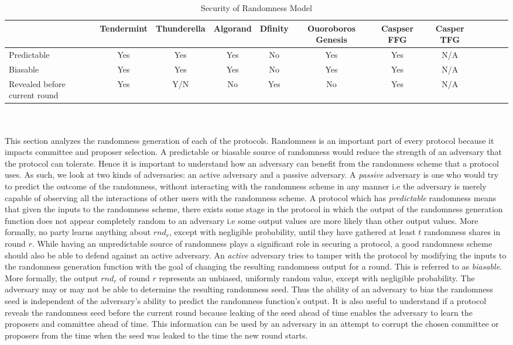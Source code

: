 \documentclass[10pt,journal,compsoc]{IEEEtran}
\begin{document}
\begin{table*}[htp]
 \caption{Security of Randomness Model}
\label{}
\begin{tabularx}{\textwidth}{@{}l*{10}{c}c@{}}
\toprule
                 & Tendermint & Thunderella & Algorand & Dfinity & Ouoroboros Genesis  & Caspser FFG & Casper TFG   \\ 
\midrule
Predictable    & Yes  &  Yes & Yes   & No & Yes & Yes & N/A   \\
\addlinespace
Biasable & Yes   & Yes  & Yes & No & Yes & Yes & N/A \\ 
\addlinespace
Revealed before current round & Yes  & Y/N  & No & Yes & No & Yes & N/A\\ 
\bottomrule
\end{tabularx}
\end{table*}
\\\\
This section analyzes the randomness generation of each of the protocols. Randomness is an important part of every protocol because it impacts committee and proposer selection. A predictable or biasable source of randomness would reduce the strength of an adversary that the protocol can tolerate. Hence it is important to understand how an adversary can benefit from the randomness scheme that a protocol uses. As such, we look at two kinds of adversaries: an active adversary and a passive adversary\cite{Mahnush}. A \emph{passive} adversary is one who would try to predict the outcome of the randomness, without interacting with the randomness scheme in any manner i.e the adversary is merely capable of observing all the interactions of other users with the randomness scheme. A protocol which has \emph{predictable} randomness means that given the inputs to the randomness scheme, there exists some stage in the protocol in which the output of the randomness generation function does not appear completely random to an adversary i.e some output values are more likely than other output values. More formally, no party learns anything about $rnd_r$, except with negligible probability, until they have gathered at least $t$ randomness shares in round $r$. While having an unpredictable source of randomness plays a significant role in securing a protocol, a good randomness scheme should also be able to defend against an active adversary. An \emph{active} adversary tries to tamper with the protocol by modifying the inputs to the randomness generation function with the goal of changing the resulting randomness output for a round. This is referred to as \emph{biasable}. More formally, the output $rnd_r$ of round $r$ represents an unbiased, uniformly random value, except with negligible probability. The adversary may or may not be able to determine the resulting randomness seed. Thus the ability of an adversary to bias the randomness seed is independent of the adversary's ability to predict the randomness function's output. It is also useful to understand if a protocol reveals the randomness seed before the current round because leaking of the seed ahead of time enables the adversary to learn the proposers and committee ahead of time. This information can be used by an adversary in an attempt to corrupt the chosen committee or proposers from the time when the seed was leaked to the time the new round starts.
\end{document}
